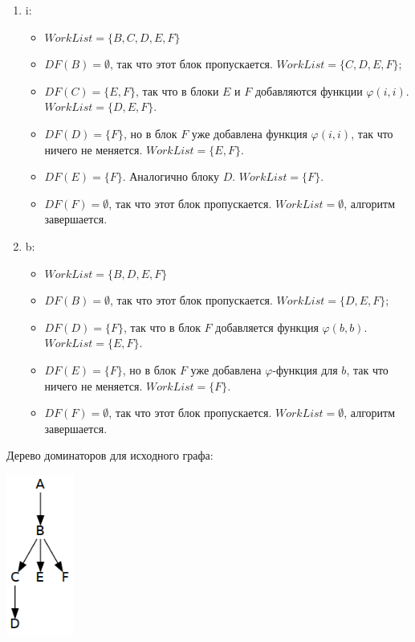 \documentclass[11pt]{article}
\begin{document}
\begin{enumerate}
\item i:
\begin{itemize}
\item \(WorkList = \{ B, C, D, E, F \}\)
\item \(DF(B) = \emptyset\), так что этот блок пропускается. \(WorkList = \{ C, D, E, F \}\);
\item \(DF(C) = \{ E, F \}\), так что в блоки \(E\) и \(F\) добавляются функции \(\varphi(i, i)\). \(WorkList = \{ D, E, F \}\).
\item \(DF(D) = \{ F \}\), но в блок \(F\) уже добавлена функция \(\varphi(i, i)\), так что ничего не меняется. \(WorkList = \{ E, F \}\).
\item \(DF(E) = \{ F \}\). Аналогично блоку \(D\). \(WorkList = \{ F \}\).
\item \(DF(F) = \emptyset\), так что этот блок пропускается. \(WorkList = \emptyset\), алгоритм завершается.
\end{itemize}
\item b:
\begin{itemize}
\item \(WorkList = \{ B, D, E, F \}\)
\item \(DF(B) = \emptyset\), так что этот блок пропускается. \(WorkList = \{ D, E, F \}\);
\item \(DF(D) = \{ F \}\), так что в блок \(F\) добавляется функция \(\varphi(b, b)\). \(WorkList = \{ E, F \}\).
\item \(DF(E) = \{ F \}\), но в блок \(F\) уже добавлена \(\varphi\)-функция для \(b\), так что ничего не меняется. \(WorkList = \{ F \}\).
\item \(DF(F) = \emptyset\), так что этот блок пропускается. \(WorkList = \emptyset\), алгоритм завершается.
\end{itemize}
\end{enumerate}

Дерево доминаторов для исходного графа:
\begin{center}
\includegraphics[height=200px]{dom.png}
\end{center}
\end{document}
